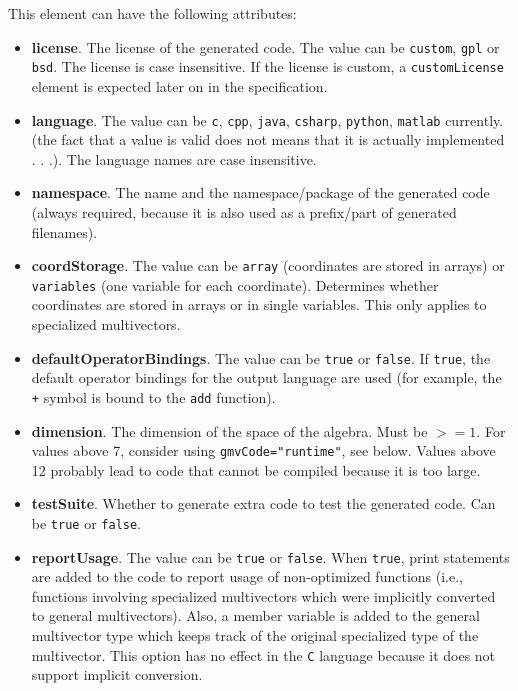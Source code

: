 \documentclass[10pt, a4paper]{article}
\begin{document}
This element can have the following attributes:
\begin{itemize}
\item {\bf license}. The license of the generated code. The value can be {\tt custom}, {\tt gpl} or {\tt bsd}. The license is case insensitive.
If the license is custom, a {\tt customLicense} element is expected later on in the specification.

\item {\bf language}. The value can be {\tt c}, {\tt cpp}, {\tt java}, {\tt csharp}, {\tt python}, {\tt matlab} currently. 
(the fact that a value is valid does not means that it is actually implemented . . .). The language names are case insensitive.

\item {\bf namespace}. The name and the namespace/package of the generated code (always required, because it is also used as a prefix/part of generated filenames).

\item {\bf coordStorage}. The value can be {\tt array} (coordinates are stored in arrays) or {\tt variables} (one variable for each coordinate). 
Determines whether coordinates are stored in arrays or in single variables. This only applies to specialized multivectors. 

\item {\bf defaultOperatorBindings}. The value can be {\tt true} or {\tt false}. If {\tt true}, the default operator bindings for the output language are used 
(for example, the {\tt +} symbol is bound to the {\tt add} function).

\item {\bf dimension}. The dimension of the space of the algebra. Must be $>= 1$. 
For values above 7, consider using {\tt gmvCode="runtime"}, see below.
Values above 12 probably lead to code that cannot be compiled because it is too large.

\item {\bf testSuite}. Whether to generate extra code to test the generated code. 
	Can be {\tt true} or {\tt false}.


\item {\bf reportUsage}. The value can be {\tt true} or {\tt false}. 
       When {\tt true}, print statements are added to the code to report usage of non-optimized functions
       (i.e., functions involving specialized multivectors which were implicitly converted to general multivectors). 
       Also, a member variable is added to the general multivector type which keeps track of the original specialized 
       type of the multivector. This option has no effect in the {\tt C} language because it does not support implicit conversion.
 

\end{itemize}
\end{document}
